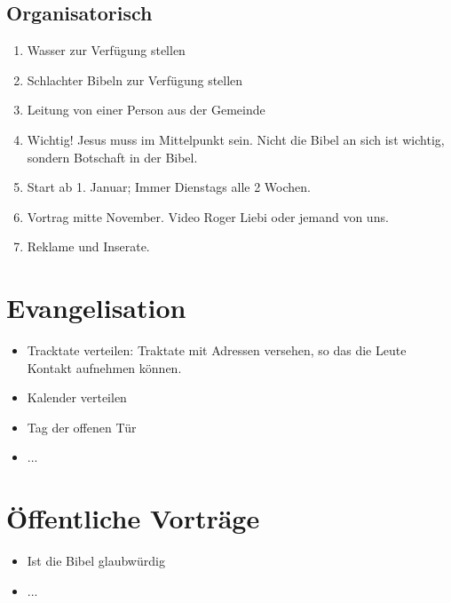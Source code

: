 \documentclass{../inc/mybib}
\begin{document}
    \subsection{Organisatorisch}
    \begin{enumerate}
        \item Wasser zur Verfügung stellen
        \item Schlachter Bibeln zur Verfügung stellen
        \item Leitung von einer Person aus der Gemeinde
        \item Wichtig! Jesus muss im Mittelpunkt sein. Nicht die Bibel an sich ist wichtig, sondern Botschaft in der Bibel.
        \item Start ab 1. Januar; Immer Dienstags alle 2 Wochen.
        \item Vortrag mitte November. Video Roger Liebi oder jemand von uns.
        \item Reklame und Inserate.
    \end{enumerate}
    \section{Evangelisation}
    \begin{itemize}
        \item Tracktate verteilen: Traktate mit Adressen versehen, so das die Leute Kontakt aufnehmen können.
        \item Kalender verteilen
        \item Tag der offenen Tür
        \item ...
    \end{itemize}
    \section{Öffentliche Vorträge}
    \begin{itemize}
        \item Ist die Bibel glaubwürdig
        \item ...
    \end{itemize}
    
    
\end{document}
